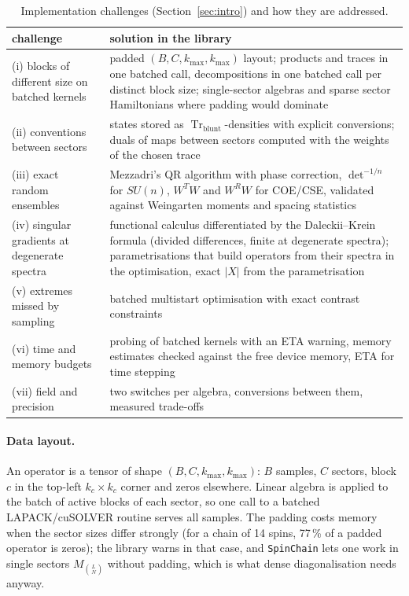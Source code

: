 \documentclass[11pt]{article}
\DeclareMathOperator{\Tr}{Tr}
\begin{document}
\begin{table}[h]
\centering\footnotesize
\begin{tabular}{p{}p{}}
\toprule
challenge & solution in the library\\
\midrule
(i) blocks of different size on batched kernels & padded $(B,C,k_{\max},k_{\max})$ layout; products and traces in one batched call, decompositions in one batched call per distinct block size; single-sector algebras and sparse sector Hamiltonians where padding would dominate\\
(ii) conventions between sectors & states stored as $\Tr_{\mathrm{blunt}}$-densities with explicit conversions;
duals of maps between sectors computed with the weights of the chosen trace\\
(iii) exact random ensembles & Mezzadri's QR algorithm with phase correction, $\det^{-1/n}$ for $SU(n)$, $W^TW$ and
$W^RW$ for COE/CSE, validated against Weingarten moments and spacing statistics\\
(iv) singular gradients at degenerate spectra & functional calculus differentiated by the Daleckii--Krein formula
(divided differences, finite at degenerate spectra); parametrisations that build operators from their spectra in the
optimisation, exact $|X|$ from the parametrisation\\
(v) extremes missed by sampling & batched multistart optimisation with exact contrast constraints\\
(vi) time and memory budgets & probing of batched kernels with an ETA warning, memory estimates checked against the
free device memory, ETA for time stepping\\
(vii) field and precision & two switches per algebra, conversions between them, measured trade-offs\\
\bottomrule
\end{tabular}
\caption{Implementation challenges (Section~\ref{sec:intro}) and how they are addressed.}
\label{tab:challenges}
\end{table}

\paragraph{Data layout.} An operator is a tensor of shape $(B,C,k_{\max},k_{\max})$: $B$ samples, $C$
sectors, block $c$ in the top-left $k_c\times k_c$ corner and zeros elsewhere. Linear algebra is applied
to the batch of active blocks of each sector, so one call to a batched LAPACK/cuSOLVER routine serves all
samples. The padding costs memory when the sector sizes differ strongly (for a chain of 14 spins,
77\,\% of a padded operator is zeros); the library warns in that case, and \texttt{SpinChain} lets one work
in single sectors $M_{\binom LN}$ without padding, which is what dense diagonalisation needs anyway.
\end{document}
